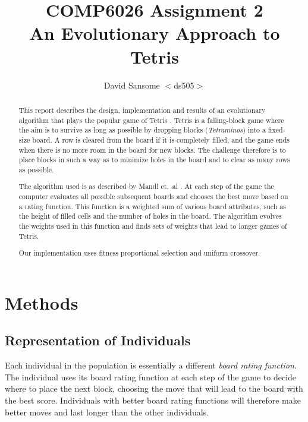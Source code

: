 \documentclass[a4paper,12pt]{article}
\title{COMP6026 Assignment 2 \\
An Evolutionary Approach to Tetris}
\author{David Sansome $<$ds505$>$}
\begin{document}


\maketitle

\begin{abstract}

This report describes the design, implementation and results of an evolutionary
algorithm that plays the popular game of Tetris \cite{AboutTetris}.
Tetris is a falling-block game where the aim is to survive as long as possible
by dropping blocks (\emph{Tetraminos}) into a fixed-size board.
A row is cleared from the board if it is completely filled, and the game ends
when there is no more room in the board for new blocks.
The challenge therefore is to place blocks in such a way as to minimize holes
in the board and to clear as many rows as possible.

The algorithm used is as described by Mandl et.\ al \cite{Mandl2005}.
At each step of the game the computer evaluates all possible subsequent boards
and chooses the best move based on a rating function.
This function is a weighted sum of various board attributes, such as the height
of filled cells and the number of holes in the board.
The algorithm evolves the weights used in this function and finds sets of
weights that lead to longer games of Tetris.

Our implementation uses fitness proportional selection and uniform crossover.

\end{abstract}

\tableofcontents

\section{Methods}

\subsection{Representation of Individuals}

Each individual in the population is essentially a different \emph{board
rating function}.
The individual uses its board rating function at each step of the game to
decide where to place the next block, choosing the move that will lead to the
board with the best score.
Individuals with better board rating functions will therefore make better moves
and last longer than the other individuals.
\end{document}
